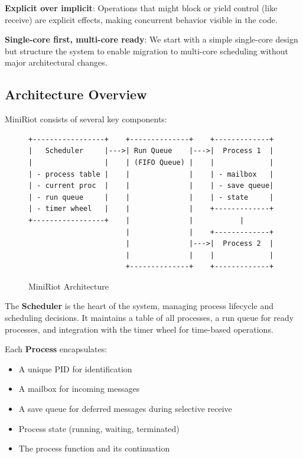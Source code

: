 \documentclass[sigplan,screen]{acmart}
\begin{document}
\textbf{Explicit over implicit}: Operations that might block or yield control (like receive) are explicit effects, making concurrent behavior visible in the code.

\textbf{Single-core first, multi-core ready}: We start with a simple single-core design but structure the system to enable migration to multi-core scheduling without major architectural changes.

\subsection{Architecture Overview}

MiniRiot consists of several key components:

\begin{figure}[h]
\centering
\begin{verbatim}
+-----------------+    +--------------+    +-------------+
|   Scheduler     |--->| Run Queue    |--->|  Process 1  |
|                 |    | (FIFO Queue) |    |             |
| - process table |    |              |    | - mailbox   |
| - current proc  |    |              |    | - save queue|
| - run queue     |    |              |    | - state     |
| - timer wheel   |    |              |    +-------------+
+-----------------+    |              |           |
                       |              |    +-------------+
                       |              |--->|  Process 2  |
                       |              |    |             |
                       +--------------+    +-------------+
\end{verbatim}
\caption{MiniRiot Architecture}
\end{figure}

The \textbf{Scheduler} is the heart of the system, managing process lifecycle and scheduling decisions. It maintains a table of all processes, a run queue for ready processes, and integration with the timer wheel for time-based operations.

Each \textbf{Process} encapsulates:
\begin{itemize}
\item A unique PID for identification
\item A mailbox for incoming messages
\item A save queue for deferred messages during selective receive
\item Process state (running, waiting, terminated)
\item The process function and its continuation
\end{itemize}
\end{document}
